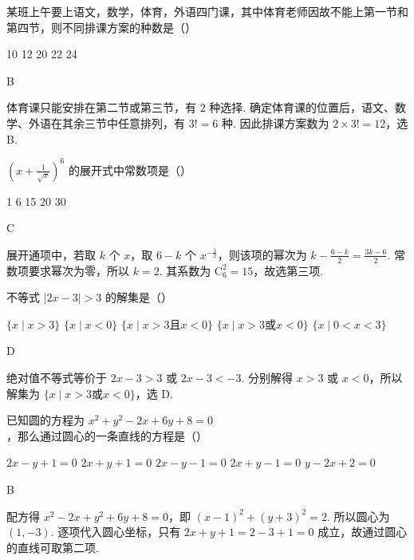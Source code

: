 \documentclass[UTF8,a4paper,oneside,11pt]{ctexbook}
\begin{document}
\begin{problem}

某班上午要上语文，数学，体育，外语四门课，其中体育老师因故不能上第一节和第四节，则不同排课方案的种数是（\quad）

\choicesfive
    {10}
    {12}
    {20}
    {22}
    {24}
\begin{answer}
B
\end{answer}

\begin{solution}
体育课只能安排在第二节或第三节，有 \(2\) 种选择. 确定体育课的位置后，语文、数学、外语在其余三节中任意排列，有 \(3!=6\) 种. 因此排课方案数为 \(2\times3!=12\)，选 B.
\end{solution}
\end{problem}

\begin{problem}

\(\left(x + \frac{1}{\sqrt{x}}\right)^6\) 的展开式中常数项是（\quad）

\choicesfive
    {1}
    {6}
    {15}
    {20}
    {30}
\begin{answer}
C
\end{answer}

\begin{solution}
展开通项中，若取 \(k\) 个 \(x\)，取 \(6-k\) 个 \(x^{-\frac{1}{2}}\)，则该项的幂次为
\(k-\frac{6-k}{2}=\frac{3k-6}{2}\). 常数项要求幂次为零，所以 \(k=2\). 其系数为 \(\mathrm C_6^2=15\)，故选第三项.
\end{solution}
\end{problem}

\begin{problem}

不等式 \(|2x-3|>3 \) 的解集是（\quad）

\choicesfive
    {\(\{x\mid x>3\} \)}
    {\(\{x\mid x<0\} \)}
    {\(\{x\mid x>3 \text{且} x<0\}\)}
    {\(\{x\mid x>3\text{或}x<0\} \)}
    {\(\{x\mid 0<x<3\} \)}
\begin{answer}
D
\end{answer}

\begin{solution}
绝对值不等式等价于
\(2x-3>3\) 或 \(2x-3<-3\). 分别解得 \(x>3\) 或 \(x<0\)，所以解集为 \(\{x\mid x>3\text{或}x<0\}\)，选 D.
\end{solution}
\end{problem}

\begin{problem}

已知圆的方程为 \(x^{2} + y^{2} - 2x + 6y + 8 = 0\)，那么通过圆心的一条直线的方程是（\quad）

\choicesfive
    {\(2x - y + 1 = 0\)}
    {\(2x + y + 1 = 0\)}
    {\(2x - y - 1 = 0\)}
    {\(2x + y - 1 = 0\)}
    {\(y - 2x + 2 = 0\)}
\begin{answer}
B
\end{answer}

\begin{solution}
配方得 \(x^{2}-2x+y^{2}+6y+8=0\)，即 \((x-1)^{2}+(y+3)^{2}=2\). 所以圆心为 \((1,-3)\). 逐项代入圆心坐标，只有 \(2x+y+1=2-3+1=0\) 成立，故通过圆心的直线可取第二项.
\end{solution}
\end{problem}
\end{document}
